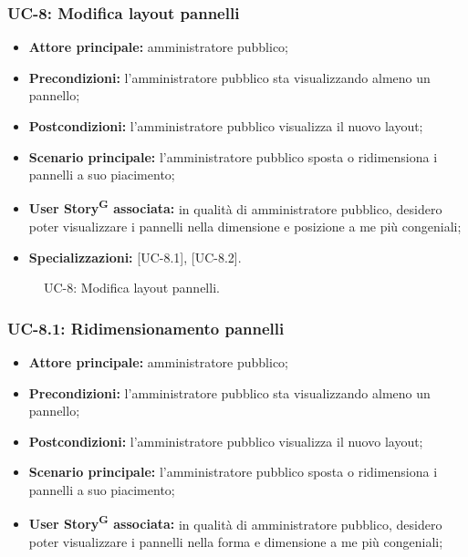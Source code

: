 \documentclass[8pt]{article}
\newcommand{\glossterm}[1]{#1\textsuperscript{G}} %
\begin{document}
\subsubsection*{UC-8: Modifica layout pannelli}
\begin{itemize}
    \item \textbf{Attore principale:} amministratore pubblico;
    \item \textbf{Precondizioni:} l'amministratore pubblico sta visualizzando almeno un pannello;
    \item \textbf{Postcondizioni:} l’amministratore pubblico visualizza il nuovo layout;
    \item \textbf{Scenario principale: }l’amministratore pubblico sposta o ridimensiona i pannelli a
        suo piacimento;
    \item \textbf{\glossterm{User Story} associata:} in qualità di amministratore pubblico, desidero poter
        visualizzare i pannelli nella dimensione e posizione a me più congeniali;
    \item \textbf{Specializzazioni:} [UC-8.1], [UC-8.2].
\end{itemize}
\begin{figure}[ht!]
    \centering
    \caption{UC-8: Modifica layout pannelli.}
    \label{fig:UC-8: Modifica layout pannelli}
\end{figure}
\subsubsection*{UC-8.1: Ridimensionamento pannelli}
\begin{itemize}
    \item \textbf{Attore principale:} amministratore pubblico;
    \item \textbf{Precondizioni:} l'amministratore pubblico sta visualizzando almeno un pannello;
    \item \textbf{Postcondizioni:} l’amministratore pubblico visualizza il nuovo layout;
    \item \textbf{Scenario principale: }l’amministratore pubblico sposta o ridimensiona i pannelli a
        suo piacimento;
    \item \textbf{\glossterm{User Story} associata:} in qualità di amministratore pubblico, desidero poter
        visualizzare i pannelli nella forma e dimensione a me più congeniali;
\end{itemize}
\end{document}

